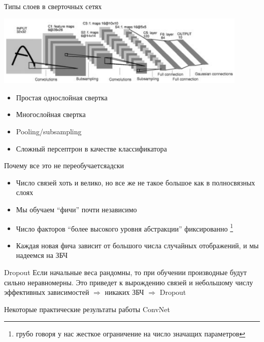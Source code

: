 \documentclass[14pt, fleqn, xcolor={dvipsnames, table}]{beamer}
\begin{document}
\begin{frame}{Типы слоев в сверточных сетях}
\begin{center}\includegraphics[width=0.9\textwidth]{convnet.png}\end{center}
\begin{itemize}
\item Простая однослойная свертка 
\item Многослойная свертка
\item Pooling/subsampling
\item Сложный персептрон в качестве классификатора
\end{itemize}
\end{frame}

\begin{frame}{Почему все это не переобучается}{адски}
\small
\begin{itemize}
  \item Число связей хоть и велико, но все же не такое большое как в полносвязных слоях
  \item Мы обучаем ``фичи'' почти независимо
  \item Число факторов ``более высокого уровня абстракции'' фиксированно \footnote{грубо говоря у нас жесткое ограничение на число значащих параметров}
  \item Каждая новая фича зависит от большого числа случайных отображений, и мы надеемся на ЗБЧ
\end{itemize}
\end{frame}

\begin{frame}{Dropout}
\small
Если начальные веса рандомны, то при обучении производные будут сильно неравномерны. Это приведет к вырождению связей и небольшому числу эффективных зависимостей $\Rightarrow$ никаких ЗБЧ $\Rightarrow$ Dropout 
\end{frame}

\begin{frame}{Некоторые практические результаты работы ConvNet}
\end{frame}
\end{document}
